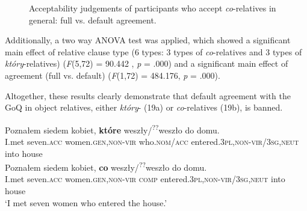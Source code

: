 \documentclass[output=paper]{langsci/langscibook}
\begin{document}
\begin{figure}
\caption{Acceptability judgements of participants who accept \textit{co}{}-relatives in general: full vs. default agreement.}
\label{fig:leska:3}
\end{figure}

Additionally, a two way ANOVA test was applied, which showed a significant main effect of relative clause type (6 types: 3 types of \textit{co}{}-relatives and 3 types of \textit{który}{}-relatives) (\textit{F}(5,72) = 90.442 , \textit{p} = .000) and a significant main effect of agreement (full vs. default) (\textit{F}(1,72) = 484.176, \textit{p} = .000).


Altogether, these results clearly demonstrate that default agreement with the GoQ in object relatives, either \textit{który}{}- (19a) or \textit{co}{}-relatives (19b), is banned. 

\ea%
    \label{ex:leska:19}
    \ea
    \gll Poznałem   siedem   kobiet,     \textbf{które} weszły/\textsuperscript{??}weszło       do   domu.\\
         I.met     seven.\textsc{acc}   women.\textsc{gen,non-vir}  who.\textsc{nom/acc} entered.\textsc{3pl,non-vir}/\textsc{3sg,neut}   into   house \\
    \ex
    \gll Poznałem   siedem   kobiet,     \textbf{co} weszły/\textsuperscript{??}weszło       do   domu.\\
          I.met     seven.\textsc{acc}   women.\textsc{gen,non-vir}  \textsc{comp}     entered.\textsc{3pl,non-vir}/\textsc{3sg,neut}   into  house        \\
    \glt ‘I met seven women who entered the house.’
    \z
\z
\end{document}
